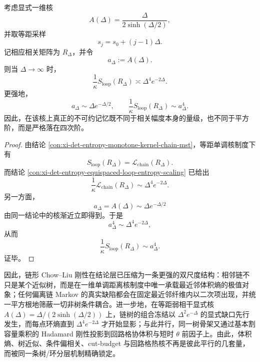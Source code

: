 \begin{theorem}[长距核的四次记忆律]\label{thm:conclusion-long-range-kernel-quartic-memory-law}
考虑显式一维核
\[
A(\Delta)=\frac{\Delta}{2\sinh(\Delta/2)},
\]
并取等距采样
\[
s_j=s_0+(j-1)\Delta.
\]
记相应相关矩阵为 \(R_\Delta\)，并令
\[
a_\Delta:=A(\Delta).
\]
则当 \(\Delta\to\infty\) 时，
\[
\frac{1}{\kappa}S_{\mathrm{loop}}(R_\Delta)\asymp \Delta^4e^{-2\Delta}.
\]
更强地，
\[
a_\Delta\sim \Delta e^{-\Delta/2},
\qquad
\frac{1}{\kappa}S_{\mathrm{loop}}(R_\Delta)\sim a_\Delta^4.
\]
因此，在该核上真正的不可约记忆既不同于相关幅度本身的量级，也不同于平方阶，而是严格落在四次阶。
\end{theorem}
\begin{proof}
由结论 \ref{con:xi-det-entropy-monotone-kernel-chain-mst}，等距单调核制度下有
\[
S_{\mathrm{loop}}(R_\Delta)=\mathcal L_{\mathrm{chain}}(R_\Delta).
\]
而结论 \ref{con:xi-det-entropy-equispaced-loop-entropy-scaling} 已给出
\[
\frac{1}{\kappa}\mathcal L_{\mathrm{chain}}(R_\Delta)\sim \Delta^4e^{-2\Delta}.
\]
另一方面，
\[
a_\Delta=A(\Delta)\sim \Delta e^{-\Delta/2}
\]
由同一结论中的核渐近立即得到。于是
\[
a_\Delta^4\sim \Delta^4e^{-2\Delta},
\]
从而
\[
\frac{1}{\kappa}S_{\mathrm{loop}}(R_\Delta)\sim a_\Delta^4.
\]
证毕。
\end{proof}



\noindent
因此，链形 Chow--Liu 刚性在结论层已压缩为一条更强的双尺度结构：相邻链不只是某个近似树，而是在一维单调距离核制度中唯一承载最近邻体积熵的极值对象；任何偏离链 Markov 的真实缺陷都会在固定最近邻纤维内以二次项出现，并统一平方根地筛蔽一切非树条件耦合。进一步地，在等距弱相干显式核 \(A(\Delta)=\Delta/(2\sinh(\Delta/2))\) 上，链树的组合冻结以 \(\Delta^2e^{-\Delta}\) 的显式缺口先行发生，而每点环熵直到 \(\Delta^4e^{-2\Delta}\) 才开始显影；与此并行，同一树骨架又通过基本割容量乘积的 Hadamard 刚性投影到回路格协体积与短时 \(\theta\) 前因子上。由此，体积熵、树近似、条件偏相关、cut-budget 与回路格热核不再是彼此平行的几套量，而被同一条树/环分层机制精确锁定。

\endinput
